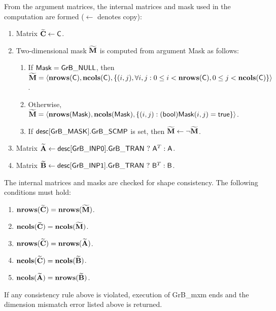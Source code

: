 From the argument matrices, the internal matrices and mask used in the computation are formed ($\leftarrow$ denotes copy):
\begin{enumerate}

	\item Matrix ${\bf \widetilde{C}} \leftarrow {\sf C}$.

	\item Two-dimensional mask ${\bf \widetilde{M}}$ is computed from argument {\sf Mask} as follows:
	\begin{enumerate}

		\item	If ${\sf Mask} = {\sf GrB\_NULL}$, then ${\bf \widetilde{M}} = \langle \bold{nrows}({\sf C}), \bold{ncols}({\sf C}), \{(i,j), \forall i,j : 0 \leq i <  \bold{nrows}({\sf C}), 0 \leq j < \bold{ncols}({\sf C}) \} \rangle$.

		\item	Otherwise, ${\bf \widetilde{M}} = \langle \bold{nrows}({\sf Mask}), \bold{ncols}({\sf Mask}), \{(i,j) : ({\sf bool}){\sf Mask}(i,j) = {\sf true}\} \rangle$.

		\item	If ${\sf desc[GrB\_MASK].GrB\_SCMP}$ is set, then ${\bf \widetilde{M}} \leftarrow \neg {\bf \widetilde{M}}$.

	\end{enumerate}

	\item Matrix ${\bf \widetilde{A}} \leftarrow {\sf desc[GrB\_INP0].GrB\_TRAN} \ ? \ {\sf A}^T : {\sf A}$.

	\item Matrix ${\bf \widetilde{B}} \leftarrow {\sf desc[GrB\_INP1].GrB\_TRAN} \ ? \ {\sf B}^T : {\sf B}$.
\end{enumerate}

The internal matrices and masks are checked for shape consistency. The following 
conditions must hold:
\begin{enumerate}
	\item $\bold{nrows}({\bf \widetilde{C}}) = \bold{nrows}({\bf \widetilde{M}})$.

	\item $\bold{ncols}({\bf \widetilde{C}}) = \bold{ncols}({\bf \widetilde{M}})$.

	\item $\bold{nrows}({\bf \widetilde{C}}) = \bold{nrows}({\bf \widetilde{A}})$.

	\item $\bold{ncols}({\bf \widetilde{C}}) = \bold{ncols}({\bf \widetilde{B}})$.

	\item $\bold{ncols}({\bf \widetilde{A}}) = \bold{nrows}({\bf \widetilde{B}})$.
\end{enumerate}
If any consistency rule above is violated, execution of {\sf GrB\_mxm} ends and 
the dimension mismatch error listed above is returned.

